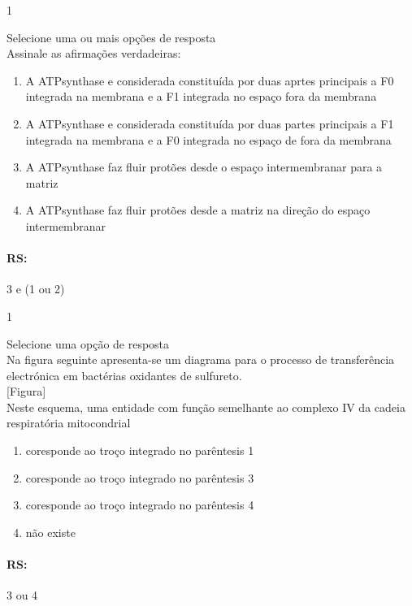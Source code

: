 \documentclass[\mainfilename]{subfiles}
\begin{document}
\begin{questionBox}1{}
    
    Selecione uma ou mais opções de resposta\\

    Assinale as afirmações verdadeiras:
    \begin{enumerate}
        \item A ATPsynthase e considerada constituída por duas aprtes principais a F0 integrada na membrana e a F1 integrada no espaço fora da membrana
        \item A ATPsynthase e considerada constituída por duas partes principais a F1 integrada na membrana e a F0 integrada no espaço de fora da membrana 
        \item A ATPsynthase faz fluir protões desde o espaço intermembranar para a matriz 
        \item A ATPsynthase faz fluir protões desde a matriz na direção do espaço intermembranar 
    \end{enumerate}

    \paragraph{RS:} 3 e (1 ou 2)
    
\end{questionBox}

\begin{questionBox}1{}
    
    Selecione uma opção de resposta\\

    Na figura seguinte apresenta-se um diagrama para o processo de transferência electrónica em  bactérias oxidantes de sulfureto.\\

    [Figura]\\

    Neste esquema, uma entidade com função semelhante ao complexo IV da cadeia respiratória mitocondrial
    \begin{enumerate}
        \item coresponde ao troço integrado no parêntesis 1
        \item coresponde ao troço integrado no parêntesis 3 
        \item coresponde ao troço integrado no parêntesis 4
        \item não existe
    \end{enumerate}

    \paragraph{RS:} 3 ou 4
    
\end{questionBox}
\end{document}
